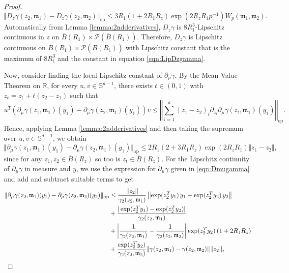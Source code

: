 \documentclass{article}
\newcommand{\R}{\mathbb{R}}
\begin{document}
\begin{appendices}
\begin{proof}
\begin{equation}\label{eqn:LipDzgamma}
   \Vert D_z\gamma(z_2,\mathfrak{m}_1)-D_{z}\gamma(z_2,\mathfrak{m}_2)\Vert_\mathrm{op}\le 3R_1(1+2R_1R_z) \exp(2R_zR_1p^{-1}) W_p(\mathfrak{m}_1,\mathfrak{m}_2).
\end{equation}
 Automatically from Lemma \ref{lemma:2ndderivatives}, $D_z\gamma$ is $8R_1^3$-Lipschitz continuous in $z$ on $\bar B(R_1)\times \mathcal P(\bar B(R_1))$. Therefore, $D_z\gamma$ is Lipschitz continuous on $\bar B(R_1)\times \mathcal P(\bar B(R_1))$ with Lipschitz constant that is the maximum of $8R_1^3$ and the constant in equation \eqref{eqn:LipDzgamma}.

Now, consider finding the local Lipschitz constant of $\partial_\mu\gamma$. By the Mean Value Theorem on $\R$, for every $u,v\in \mathbb S^{d-1}$, there exists $t\in(0,1)$ with $z_t=z_1+t(z_2-z_1)$ such that
\[
u^T\left( \partial_\mu\gamma(z_1,\mathfrak{m}_1)(y_1)-\partial_\mu\gamma(z_2,\mathfrak{m}_1)(y_1)\right)v\le \left\Vert \sum_{i=1}^d (z_1-z_2)_i \partial_{z_i}\partial_\mu \gamma(z_t,\mathfrak{m}_1)(y_1) \right\Vert_\mathrm{op}.
\]
Hence, applying Lemma \ref{lemma:2ndderivatives} and then taking the supremum over $u,v \in \mathbb S^{d-1}$, we obtain
\begin{equation}\label{eqn:LipDmugamma3}
  \Vert \partial_\mu\gamma(z_1,\mathfrak{m}_1)(y_1)-\partial_\mu\gamma(z_2,\mathfrak{m}_1)(y_1)\Vert_\mathrm{op}\le 2R_1(2+3R_1R_z) \exp(2R_zR_1) \Vert z_1-z_2\Vert,   
\end{equation}
since for any $z_1,z_2\in \bar B(R_z)$ so too is $z_t\in \bar B(R_z)$. For the Lipschitz continuity of $\partial_\mu \gamma$ in measure and $y$, we use the expression for $\partial_\mu \gamma$ given in  \eqref{eqn:Dmugamma} and add and subtract suitable terms to get 
\begin{align}
    \Vert \partial_\mu\gamma(z_2,\mathfrak{m}_1)(y_1)-\partial_\mu\gamma(z_2,\mathfrak{m}_2)(y_2)\Vert_\mathrm{op}&\le \frac{\Vert z_2\Vert}{\gamma_2(z_2,\mathfrak{m}_1)}\left\Vert \exp(z_2^Ty_1)\,y_1-\exp(z_2^Ty_2)\,y_2\right\Vert\notag\\&+ \frac{\vert \exp(z_2^Ty_1)-\exp(z_2^Ty_2)\vert}{\gamma_2(z_2,\mathfrak{m}_1)}\notag\\&+\left\vert \frac{1}{\gamma_2(z_2,\mathfrak{m}_1)}-\frac{1}{\gamma_2(z_2,\mathfrak{m}_2)}\right\vert\exp(z_2^Ty_2)\left(1+2R_1R_z \right)\notag\\
    &+\frac{\exp(z_2^Ty_2)}{\gamma_2(z_2,\mathfrak{m}_2)}\Vert \gamma(z_2,\mathfrak{m}_1)-\gamma(z_2,\mathfrak{m}_2)\Vert \Vert z_2\Vert,\label{eqn:LipDmugamma}

\end{align}
\end{proof}
\end{appendices}
\end{document}
